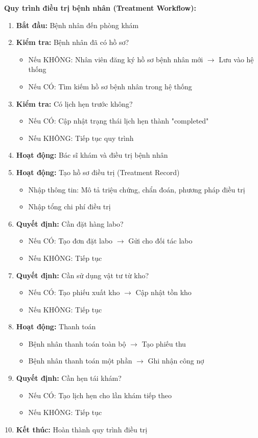 \textbf{Quy trình điều trị bệnh nhân (Treatment Workflow):}
\begin{enumerate}
\item \textbf{Bắt đầu:} Bệnh nhân đến phòng khám
\item \textbf{Kiểm tra:} Bệnh nhân đã có hồ sơ?
    \begin{itemize}
    \item Nếu KHÔNG: Nhân viên đăng ký hồ sơ bệnh nhân mới $\rightarrow$ Lưu vào hệ thống
    \item Nếu CÓ: Tìm kiếm hồ sơ bệnh nhân trong hệ thống
    \end{itemize}
\item \textbf{Kiểm tra:} Có lịch hẹn trước không?
    \begin{itemize}
    \item Nếu CÓ: Cập nhật trạng thái lịch hẹn thành "completed"
    \item Nếu KHÔNG: Tiếp tục quy trình
    \end{itemize}
\item \textbf{Hoạt động:} Bác sĩ khám và điều trị bệnh nhân
\item \textbf{Hoạt động:} Tạo hồ sơ điều trị (Treatment Record)
    \begin{itemize}
    \item Nhập thông tin: Mô tả triệu chứng, chẩn đoán, phương pháp điều trị
    \item Nhập tổng chi phí điều trị
    \end{itemize}
\item \textbf{Quyết định:} Cần đặt hàng labo?
    \begin{itemize}
    \item Nếu CÓ: Tạo đơn đặt labo $\rightarrow$ Gửi cho đối tác labo
    \item Nếu KHÔNG: Tiếp tục
    \end{itemize}
\item \textbf{Quyết định:} Cần sử dụng vật tư từ kho?
    \begin{itemize}
    \item Nếu CÓ: Tạo phiếu xuất kho $\rightarrow$ Cập nhật tồn kho
    \item Nếu KHÔNG: Tiếp tục
    \end{itemize}
\item \textbf{Hoạt động:} Thanh toán
    \begin{itemize}
    \item Bệnh nhân thanh toán toàn bộ $\rightarrow$ Tạo phiếu thu
    \item Bệnh nhân thanh toán một phần $\rightarrow$ Ghi nhận công nợ
    \end{itemize}
\item \textbf{Quyết định:} Cần hẹn tái khám?
    \begin{itemize}
    \item Nếu CÓ: Tạo lịch hẹn cho lần khám tiếp theo
    \item Nếu KHÔNG: Tiếp tục
    \end{itemize}
\item \textbf{Kết thúc:} Hoàn thành quy trình điều trị
\end{enumerate}

